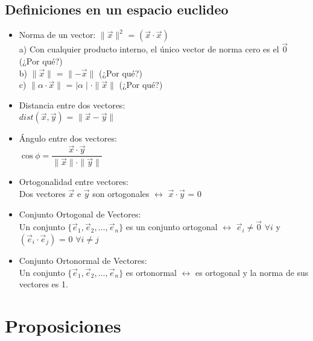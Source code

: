 \documentclass[11pt]{article}
\begin{document}
\subsection{Definiciones en un espacio euclideo}
\begin{itemize}
\item Norma de un vector: $\parallel\vec{x}\parallel^2$ = $(\vec{x}\cdot\vec{x})$\\
a) Con cualquier producto interno, el único vector de norma cero es el $\vec{0}$ (¿Por qué?)\\
b) $\parallel\vec{x}\parallel$ = $\parallel-\vec{x}\parallel$ (¿Por qué?)\\
c) $\parallel\alpha\cdot\vec{x}\parallel$ = $\mid\alpha\mid\cdot\parallel\vec{x}\parallel$ (¿Por qué?)
\item Distancia entre dos vectores: \\$dist(\vec{x},\vec{y})$ = $\parallel\vec{x}-\vec{y}\parallel$
\item Ángulo entre dos vectores: \\$\cos \phi = \dfrac{\vec{x}\cdot\vec{y}}{\parallel\vec{x}\parallel\cdot\parallel\vec{y}\parallel}$
\item Ortogonalidad entre vectores: \\
Dos vectores $\vec{x}$ e $\vec{y}$ son ortogonales $\leftrightarrow$ $\vec{x}\cdot\vec{y}$ = $0$
\item Conjunto Ortogonal de Vectores: \\
Un conjunto $\{\vec{e}_1, \vec{e}_2, \hdots, \vec{e}_n\}$ es un conjunto ortogonal $\leftrightarrow$ $\vec{e}_i \neq \vec{0}$ $\forall i$ y $(\vec{e}_i\cdot\vec{e}_j)$ = $0$ $\forall i \neq j$
\item Conjunto Ortonormal de Vectores: \\
Un conjunto $\{\vec{e}_1, \vec{e}_2, \hdots, \vec{e}_n\}$ es ortonormal $\leftrightarrow$ es ortogonal y la norma de sus vectores es 1.
\end{itemize}
\section{Proposiciones}
\end{document}
